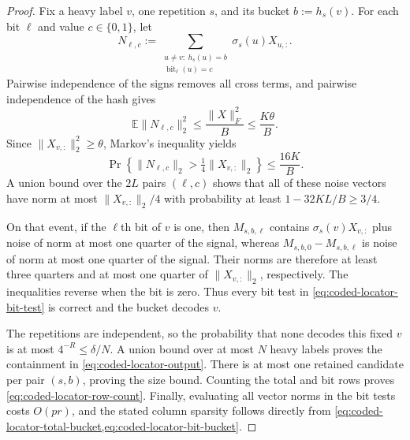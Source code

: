 \begin{proof}
Fix a heavy label $v$, one repetition $s$, and its bucket
$b:=h_s(v)$.  For each bit $\ell$ and value $c\in\{0,1\}$, let
\begin{equation*}
 N_{\ell,c}
 :=\sum_{\substack{u\neq v:\ h_s(u)=b\\
              \operatorname{bit}_\ell(u)=c}}
       \sigma_s(u)X_{u,:}.
\end{equation*}
Pairwise independence of the signs removes all cross terms, and pairwise
independence of the hash gives
\begin{equation*}
 \mathbb E\|N_{\ell,c}\|_2^2
 \leq\frac{\|X\|_F^2}{B}
 \leq\frac{K\theta}{B}.
\end{equation*}
Since $\|X_{v,:}\|_2^2\geq\theta$, Markov's inequality yields
\begin{equation*}
 \Pr\!\left\{
  \|N_{\ell,c}\|_2>\tfrac14\|X_{v,:}\|_2
 \right\}
 \leq\frac{16K}{B}.
\end{equation*}
A union bound over the $2L$ pairs $(\ell,c)$ shows that all of these noise
vectors have norm at most $\|X_{v,:}\|_2/4$ with probability at least
$1-32KL/B\geq3/4$.

On that event, if the $\ell$th bit of $v$ is one, then
$M_{s,b,\ell}$ contains $\sigma_s(v)X_{v,:}$ plus noise of norm at most one
quarter of the signal, whereas
$M_{s,b,0}-M_{s,b,\ell}$ is noise of norm at most one quarter of the signal.
Their norms are therefore at least three quarters and at most one quarter of
$\|X_{v,:}\|_2$, respectively.  The inequalities reverse when the bit is
zero.  Thus every bit test in
\cref{eq:coded-locator-bit-test} is correct and the bucket decodes $v$.

The repetitions are independent, so the probability that none decodes this
fixed $v$ is at most $4^{-R}\leq\delta/N$.  A union bound over at most $N$
heavy labels proves the containment in
\cref{eq:coded-locator-output}.  There is at most one retained candidate per
pair $(s,b)$, proving the size bound.  Counting the total and bit rows proves
\cref{eq:coded-locator-row-count}.  Finally, evaluating all vector norms in
the bit tests costs $O(pr)$, and the stated column sparsity follows directly
from \cref{eq:coded-locator-total-bucket,eq:coded-locator-bit-bucket}.
\end{proof}

